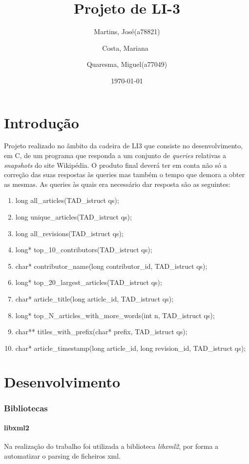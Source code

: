 \documentclass{report}
\title{Projeto de LI-3}
\author{Martins, José(a78821)
        \and 
        Costa, Mariana\  
        \and 
        Quaresma, Miguel(a77049)
        }
\date{\today}                   %
\begin{document}
\begin{titlepage}
\maketitle
\end{titlepage}

\tableofcontents

\part{Introdução}
\justify
Projeto realizado no âmbito da cadeira de LI3 que consiste no desenvolvimento, em C, de um programa que responda a um conjunto de \textit{queries} relativas a \textit{snapshots} do site Wikipédia. O produto final deverá ter em conta não só a correção das suas respostas às queries mas também o tempo que demora a obter as mesmas.
As queries às quais era necessário dar resposta são as seguintes:
\begin{enumerate}
    \item long all\_articles(TAD\_istruct qs);
    \item long unique\_articles(TAD\_istruct qs);
    \item long all\_revisions(TAD\_istruct qs);
    \item long* top\_10\_contributors(TAD\_istruct qs);
    \item char* contributor\_name(long contributor\_id, TAD\_istruct qs);
    \item long* top\_20\_largest\_articles(TAD\_istruct qs);
    \item char* article\_title(long article\_id, TAD\_istruct qs);
    \item long* top\_N\_articles\_with\_more\_words(int n, TAD\_istruct qs);
    \item char** titles\_with\_prefix(char* prefix, TAD\_istruct qs);
    \item char* article\_timestamp(long article\_id, long revision\_id, TAD\_istruct qs);
\end{enumerate}


\part{Desenvolvimento}
\section{Bibliotecas}

\subsection{libxml2}
Na realização do trabalho foi utilizada a biblioteca \emph{libxml2}, por forma a automatizar o parsing de ficheiros xml.
\end{document}
